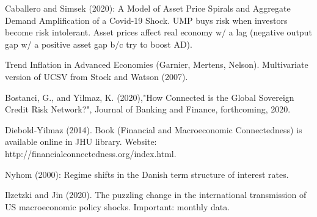 \documentclass[12pt]{article}
\begin{document}
\begin{todolist}
	\item Caballero and Simsek (2020): A Model of Asset Price Spirals and Aggregate Demand Amplification of a Covid-19 Shock. UMP buys risk when investors become risk intolerant. Asset prices affect real economy w/ a lag (negative output gap w/ a positive asset gap b/c try to boost AD).
	\item Trend Inflation in Advanced Economies (Garnier, Mertens, Nelson). Multivariate version of UCSV from Stock and Watson (2007).
	\item Bostanci, G., and Yilmaz, K. (2020),"How Connected is the Global Sovereign Credit Risk Network?", Journal of Banking and Finance, forthcoming, 2020.
	\item Diebold-Yilmaz (2014). Book (Financial and Macroeconomic Connectedness) is available online in JHU library. Website: http://financialconnectedness.org/index.html.
	\item Nyhom (2000): Regime shifts in the Danish term structure of interest rates.
	\item Ilzetzki and Jin (2020). The puzzling change in the international transmission of US macroeconomic policy shocks. Important: monthly data.
\end{todolist}
\end{document}
